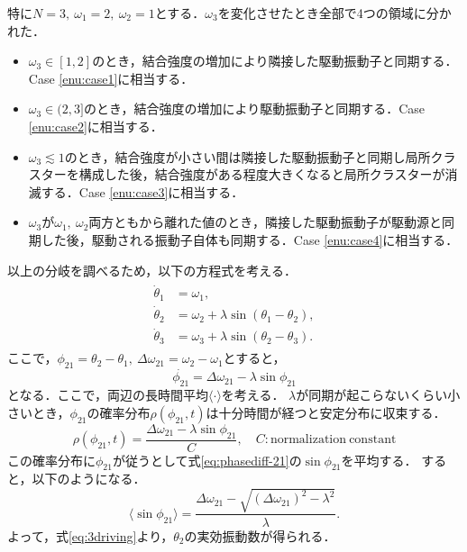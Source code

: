 \documentclass[../main]{subfiles}
\begin{document}
特に$N=3,\ \omega_1=2,\ \omega_2=1$とする．$\omega_3$を変化させたとき全部で4つの領域に分かれた．
\begin{itemize}
    \item $\omega_3\in[1,2]$のとき，結合強度の増加により隣接した駆動振動子と同期する．Case \ref{enu:case1}に相当する．
    \item $\omega_3\in(2,3]$のとき，結合強度の増加により駆動振動子と同期する．Case \ref{enu:case2}に相当する．
    \item $\omega_3\lesssim 1$のとき，結合強度が小さい間は隣接した駆動振動子と同期し局所クラスターを構成した後，結合強度がある程度大きくなると局所クラスターが消滅する．Case \ref{enu:case3}に相当する．
    \item $\omega_3$が$\omega_1,\ \omega_2$両方ともから離れた値のとき，隣接した駆動振動子が駆動源と同期した後，駆動される振動子自体も同期する．Case \ref{enu:case4}に相当する．
\end{itemize}
以上の分岐を調べるため，以下の方程式を考える．
\begin{align}
    \label{eq:3driving}
    \begin{split}
        \dot{\theta}_1&=\omega_1,\\
        \dot{\theta}_2&=\omega_2+\lambda\sin(\theta_1-\theta_2),\\
        \dot{\theta}_3&=\omega_3+\lambda\sin(\theta_2-\theta_3).
    \end{split}
\end{align}
ここで，$\phi_{21}=\theta_2-\theta_1,\ \Delta\omega_{21}=\omega_2-\omega_1$とすると，
\begin{equation}
    \label{eq:phasediff-21}
    \dot{\phi_{21}}=\Delta\omega_{21}-\lambda\sin\phi_{21}
\end{equation}
となる．ここで，両辺の長時間平均$\langle\cdot\rangle$を考える．
$\lambda$が同期が起こらないくらい小さいとき，$\phi_{21}$の確率分布$\rho(\phi_{21},t)$は十分時間が経つと安定分布に収束する．
\begin{equation}
    \rho(\phi_{21},t)=\frac{\Delta\omega_{21}-\lambda\sin\phi_{21}}{C},\quad C:\mathrm{normalization\ constant}
\end{equation}
この確率分布に$\phi_{21}$が従うとして式\eqref{eq:phasediff-21}の$\sin\phi_{21}$を平均する．
すると，以下のようになる．
\begin{equation}
    \langle\sin\phi_{21}\rangle=\frac{\Delta\omega_{21}-\sqrt{(\Delta\omega_{21})^2-\lambda^2}}{\lambda}.
\end{equation}
よって，式\eqref{eq:3driving}より，$\theta_2$の実効振動数が得られる．
\end{document}
